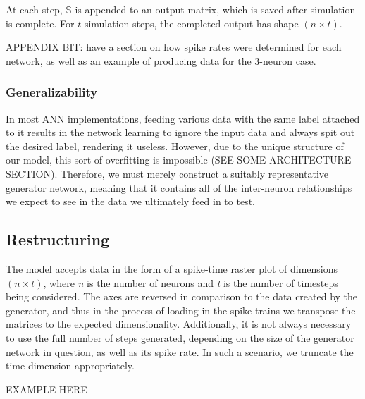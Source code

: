 At each step, $\mathbb{S}$ is appended to an output matrix, which is saved after 
simulation is complete. For $t$ simulation steps, the completed output has shape 
$(n \times t)$.

APPENDIX BIT: have a section on how spike rates were determined for each 
network, as well as an example of producing data for the 3-neuron case.

\subsubsection{Generalizability}
\label{subsubsec:hotswap}
In most ANN implementations, feeding various data with the same label attached 
to it results in the network learning to ignore the input data and always spit 
out the desired label, rendering it useless. However, due to the unique 
structure of our model, this sort of overfitting is impossible (SEE SOME 
ARCHITECTURE SECTION). Therefore, we must merely construct a suitably 
representative generator network, meaning that it contains all of the 
inter-neuron relationships we expect to see in the data we ultimately feed in to 
test.

\subsection{Restructuring}
The model accepts data in the form of a spike-time raster plot of dimensions $(n 
\times t)$, where \textit{n} is the number of neurons and \textit{t} is the 
number of timesteps being considered. The axes are reversed in comparison to the 
data created by the generator, and thus in the process of loading in the spike 
trains we transpose the matrices to the expected dimensionality. Additionally, 
it is not always necessary to use the full number of steps generated, depending 
on the size of the generator network in question, as well as its spike rate. In 
such a scenario, we truncate the time dimension appropriately.

EXAMPLE HERE
